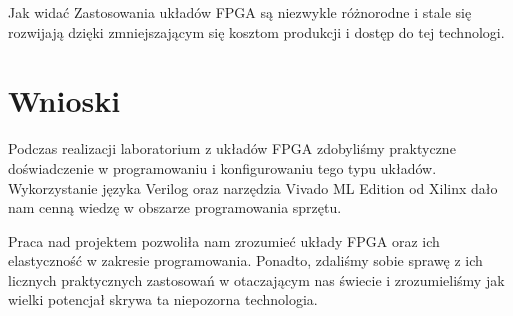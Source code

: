\documentclass[a4paper]{article}
\begin{document}
Jak widać Zastosowania układów FPGA są niezwykle różnorodne i stale się rozwijają
dzięki zmniejszającym się kosztom produkcji i  dostęp do tej technologi.

\pagebreak
\section{Wnioski}

Podczas realizacji laboratorium z układów FPGA zdobyliśmy praktyczne doświadczenie w programowaniu i konfigurowaniu tego typu układów. 
Wykorzystanie języka Verilog oraz narzędzia Vivado ML Edition od Xilinx dało nam cenną wiedzę w obszarze programowania sprzętu.

Praca nad projektem pozwoliła nam zrozumieć układy FPGA oraz ich elastyczność w zakresie programowania.
Ponadto, zdaliśmy sobie sprawę z ich licznych praktycznych zastosowań w otaczającym nas świecie
i zrozumieliśmy jak wielki potencjał skrywa ta niepozorna technologia.
\end{document}
